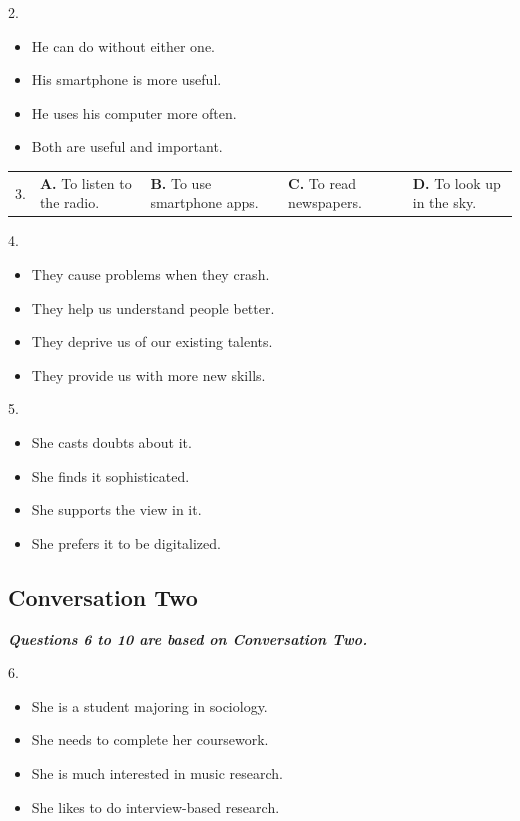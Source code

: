 \documentclass[UTF8,11pt]{ctexart}
\begin{document}
2.


\begin{itemize}[leftmargin=2em,itemsep=.2em,topsep=.4em]\item[A.] He can do without either one.
\item[B.] His smartphone is more useful.
\item[C.] He uses his computer more often.
\item[D.] Both are useful and important.
\end{itemize}

\noindent\begin{tabularx}{\linewidth}{@{}lXXXX@{}}3. & \textbf{A.} To listen to the radio. & \textbf{B.} To use smartphone apps. & \textbf{C.} To read newspapers. & \textbf{D.} To look up in the sky.\\\end{tabularx}\par

4.


\begin{itemize}[leftmargin=2em,itemsep=.2em,topsep=.4em]\item[A.] They cause problems when they crash.
\item[B.] They help us understand people better.
\item[C.] They deprive us of our existing talents.
\item[D.] They provide us with more new skills.
\end{itemize}

5.


\begin{itemize}[leftmargin=2em,itemsep=.2em,topsep=.4em]\item[A.] She casts doubts about it.
\item[B.] She finds it sophisticated.
\item[C.] She supports the view in it.
\item[D.] She prefers it to be digitalized.
\end{itemize}

\subsection*{\textbf{Conversation Two}}


\textbf{\textit{Questions 6 to 10 are based on Conversation Two.}}


6.


\begin{itemize}[leftmargin=2em,itemsep=.2em,topsep=.4em]\item[A.] She is a student majoring in sociology.
\item[B.] She needs to complete her coursework.
\item[C.] She is much interested in music research.
\item[D.] She likes to do interview-based research.
\end{itemize}
\end{document}
